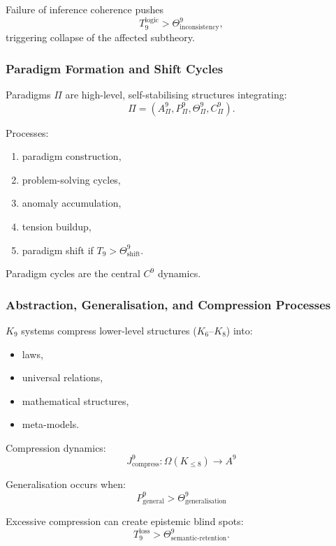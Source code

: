 Failure of inference coherence pushes 
\[
T_9^{\text{logic}} > \Theta^9_{\text{inconsistency}},
\]
triggering collapse of the affected subtheory.

\subsubsection{Paradigm Formation and Shift Cycles}

Paradigms $\Pi$ are high-level, self-stabilising structures integrating:
\[
\Pi = (A^9_{\Pi}, P^9_{\Pi}, \Theta^9_{\Pi}, C^9_{\Pi}).
\]

Processes:
\begin{enumerate}
    \item paradigm construction,
    \item problem-solving cycles,
    \item anomaly accumulation,
    \item tension buildup,
    \item paradigm shift if $T_9 > \Theta^9_{\text{shift}}$.
\end{enumerate}

Paradigm cycles are the central $C^9$ dynamics.

\subsubsection{Abstraction, Generalisation, and Compression Processes}

$K_9$ systems compress lower-level structures ($K_6$–$K_8$) into:
\begin{itemize}
    \item laws,
    \item universal relations,
    \item mathematical structures,
    \item meta-models.
\end{itemize}

Compression dynamics:
\[
J^9_{\text{compress}} : \Omega(K_{\leq 8}) \to A^9
\]

Generalisation occurs when:
\[
P^9_{\text{general}} > \Theta^9_{\text{generalisation}}
\]

Excessive compression can create epistemic blind spots:
\[
T_9^{\text{loss}} > \Theta^9_{\text{semantic-retention}}.
\]

